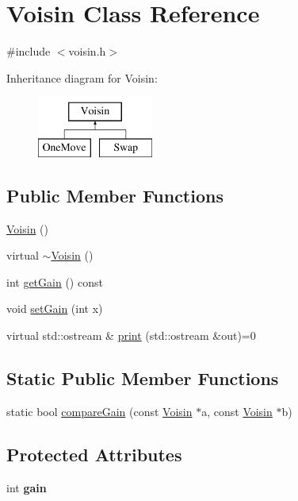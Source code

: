 \hypertarget{classVoisin}{\section{Voisin Class Reference}
\label{classVoisin}
}


{\ttfamily \#include $<$voisin.\-h$>$}

Inheritance diagram for Voisin\-:\begin{figure}[H]
\begin{center}
\leavevmode
\includegraphics[height=2.000000cm]{classVoisin}
\end{center}
\end{figure}
\subsection*{Public Member Functions}
\begin{DoxyCompactItemize}
\item 
\hyperlink{classVoisin_ac7ebea598b40b3accadf277ee76dcf8e}{Voisin} ()
\item 
virtual \hyperlink{classVoisin_a44c12c877bbdedd0244890d4f9e69529}{$\sim$\-Voisin} ()
\item 
int \hyperlink{classVoisin_a565600a9d71ffc9c69fa2aebf8e874d9}{get\-Gain} () const 
\item 
void \hyperlink{classVoisin_ad0de7a06e897b38400e3adc3d295c674}{set\-Gain} (int x)
\item 
virtual std\-::ostream \& \hyperlink{classVoisin_a2ec06b60496a36a87abde5432198d7e6}{print} (std\-::ostream \&out)=0
\end{DoxyCompactItemize}
\subsection*{Static Public Member Functions}
\begin{DoxyCompactItemize}
\item 
static bool \hyperlink{classVoisin_a99d4a6956774fbb451ed9a935c607de0}{compare\-Gain} (const \hyperlink{classVoisin}{Voisin} $\ast$a, const \hyperlink{classVoisin}{Voisin} $\ast$b)
\end{DoxyCompactItemize}
\subsection*{Protected Attributes}
\begin{DoxyCompactItemize}
\item 
\hypertarget{classVoisin_ad2fe6936726b6a8e28c02bc07c7ce9a2}{int {\bfseries gain}}\label{classVoisin_ad2fe6936726b6a8e28c02bc07c7ce9a2}

\end{DoxyCompactItemize}
